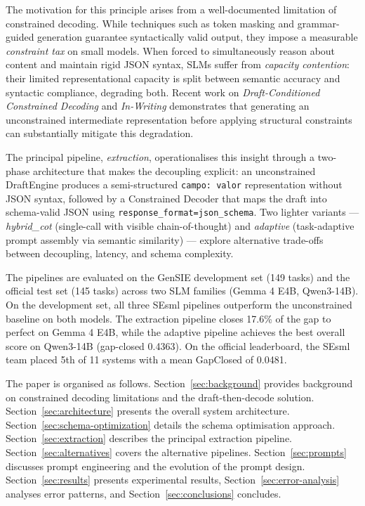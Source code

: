 \documentclass{ceurart}
\begin{document}
The motivation for this principle arises from a well-documented limitation of constrained
decoding.
While techniques such as token masking and grammar-guided generation guarantee
syntactically valid output, they impose a measurable \emph{constraint tax}
\cite{Castillo2025} on small models.
When forced to simultaneously reason about content and maintain rigid JSON syntax,
SLMs suffer from \emph{capacity contention}: their limited representational capacity
is split between semantic accuracy and syntactic compliance, degrading both.
Recent work on \emph{Draft-Conditioned Constrained Decoding} \cite{Reddy2026} and
\emph{In-Writing} \cite{Nguyen2026} demonstrates that generating an unconstrained
intermediate representation before applying structural constraints can substantially
mitigate this degradation.

The principal pipeline, \emph{extraction}, operationalises this insight through a
two-phase architecture that makes the decoupling explicit: an unconstrained
DraftEngine produces a semi-structured \texttt{campo: valor} representation without
JSON syntax, followed by a Constrained Decoder that maps the draft into schema-valid
JSON using \texttt{response\_format=json\_schema}.
Two lighter variants --- \emph{hybrid\_cot} (single-call with visible chain-of-thought)
and \emph{adaptive} (task-adaptive prompt assembly via semantic similarity) --- explore
alternative trade-offs between decoupling, latency, and schema complexity.

The pipelines are evaluated on the GenSIE development set (149 tasks) and the official
test set (145 tasks) across two SLM families (Gemma 4 E4B, Qwen3-14B).
On the development set, all three SEsml pipelines outperform the unconstrained baseline
on both models.
The extraction pipeline closes 17.6\% of the gap to perfect on Gemma 4 E4B, while the
adaptive pipeline achieves the best overall score on Qwen3-14B (gap-closed 0.4363).
On the official leaderboard, the SEsml team placed 5th of 11 systems with a mean
GapClosed of 0.0481.

The paper is organised as follows.
Section~\ref{sec:background} provides background on constrained decoding limitations
and the draft-then-decode solution.
Section~\ref{sec:architecture} presents the overall system architecture.
Section~\ref{sec:schema-optimization} details the schema optimisation approach.
Section~\ref{sec:extraction} describes the principal extraction pipeline.
Section~\ref{sec:alternatives} covers the alternative pipelines.
Section~\ref{sec:prompts} discusses prompt engineering and the evolution of the
prompt design.
Section~\ref{sec:results} presents experimental results,
Section~\ref{sec:error-analysis} analyses error patterns, and
Section~\ref{sec:conclusions} concludes.
\end{document}
